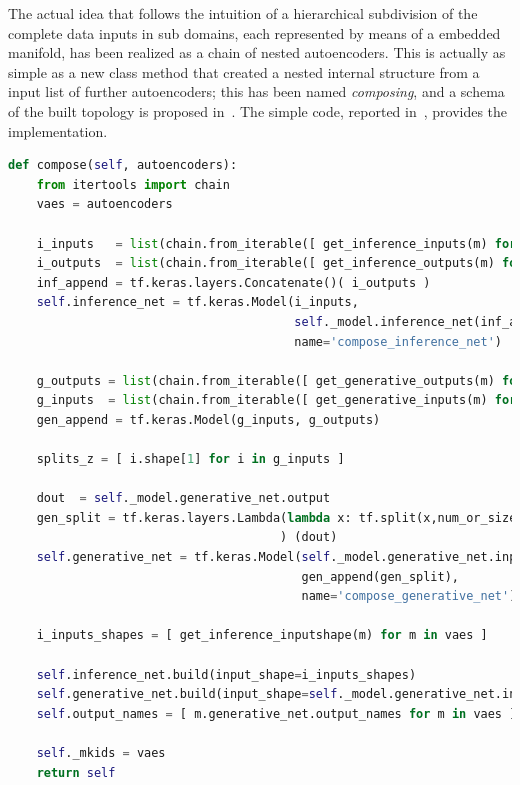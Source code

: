 The actual idea that follows the intuition of a hierarchical subdivision of the complete data inputs in sub domains, each represented by means of a embedded manifold, has been realized as a chain of nested autoencoders. This is actually as simple as a new class method that created a nested internal structure from a input list of further autoencoders; this has been named \textit{composing}, and a schema of the built topology is proposed in~\Figure{\ref{fig:VAE_compose}}.
The simple code, reported in~\Code{\ref{code:VAE_compose}}, provides the \TF implementation.
%
\begin{lstlisting}[language=Python, caption=Internal VAE method to create the composed network topology, label=code:VAE_compose]
def compose(self, autoencoders):
    from itertools import chain 
    vaes = autoencoders

    i_inputs   = list(chain.from_iterable([ get_inference_inputs(m) for m in vaes ]))
    i_outputs  = list(chain.from_iterable([ get_inference_outputs(m) for m in vaes ]))
    inf_append = tf.keras.layers.Concatenate()( i_outputs )
    self.inference_net = tf.keras.Model(i_inputs, 
                                        self._model.inference_net(inf_append), 
                                        name='compose_inference_net')
    
    g_outputs = list(chain.from_iterable([ get_generative_outputs(m) for m in vaes ]))
    g_inputs  = list(chain.from_iterable([ get_generative_inputs(m) for m in vaes ]))
    gen_append = tf.keras.Model(g_inputs, g_outputs)
    
    splits_z = [ i.shape[1] for i in g_inputs ]

    dout  = self._model.generative_net.output
    gen_split = tf.keras.layers.Lambda(lambda x: tf.split(x,num_or_size_splits=splits_z, axis=1)
                                      ) (dout)        
    self.generative_net = tf.keras.Model(self._model.generative_net.inputs, 
                                         gen_append(gen_split), 
                                         name='compose_generative_net')        
    
    i_inputs_shapes = [ get_inference_inputshape(m) for m in vaes ]

    self.inference_net.build(input_shape=i_inputs_shapes)
    self.generative_net.build(input_shape=self._model.generative_net.input_shape)
    self.output_names = [ m.generative_net.output_names for m in vaes ]

    self._mkids = vaes
    return self
\end{lstlisting}
